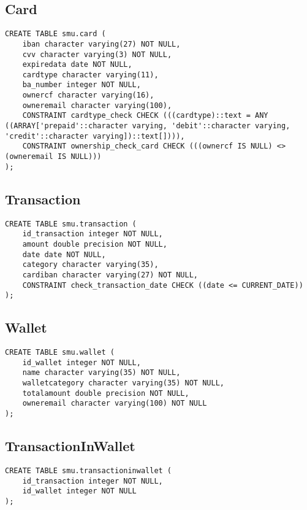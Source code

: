 \subsection{Card}

\begin{lstlisting}
CREATE TABLE smu.card (
    iban character varying(27) NOT NULL,
    cvv character varying(3) NOT NULL,
    expiredata date NOT NULL,
    cardtype character varying(11),
    ba_number integer NOT NULL,
    ownercf character varying(16),
    owneremail character varying(100),
    CONSTRAINT cardtype_check CHECK (((cardtype)::text = ANY ((ARRAY['prepaid'::character varying, 'debit'::character varying, 'credit'::character varying])::text[]))),
    CONSTRAINT ownership_check_card CHECK (((ownercf IS NULL) <> (owneremail IS NULL)))
);
\end{lstlisting}

\subsection{Transaction}

\begin{lstlisting}
CREATE TABLE smu.transaction (
    id_transaction integer NOT NULL,
    amount double precision NOT NULL,
    date date NOT NULL,
    category character varying(35),
    cardiban character varying(27) NOT NULL,
    CONSTRAINT check_transaction_date CHECK ((date <= CURRENT_DATE))
);
\end{lstlisting}

\subsection{Wallet}

\begin{lstlisting}
CREATE TABLE smu.wallet (
    id_wallet integer NOT NULL,
    name character varying(35) NOT NULL,
    walletcategory character varying(35) NOT NULL,
    totalamount double precision NOT NULL,
    owneremail character varying(100) NOT NULL
);
\end{lstlisting}

\subsection{TransactionInWallet}

\begin{lstlisting}
CREATE TABLE smu.transactioninwallet (
    id_transaction integer NOT NULL,
    id_wallet integer NOT NULL
);
\end{lstlisting}

